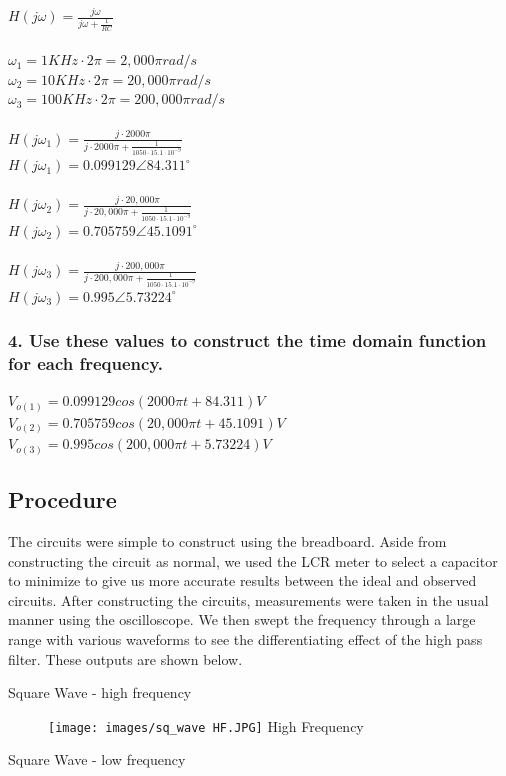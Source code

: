 \documentclass[11pt]{article}
\begin{document}
	$H(j\omega)=\frac{j\omega}{j\omega+\frac{1}{RC}}$\\\\
	$\omega_{1}=1KHz\cdot 2\pi=2,000\pi rad/s$\\
	$\omega_{2}=10KHz\cdot 2\pi=20,000\pi rad/s$\\
	$\omega_{3}=100KHz\cdot 2\pi=200,000\pi rad/s$\\\\
	$H(j\omega_{1})=\frac{j\cdot 2000\pi}{j\cdot 2000\pi+\frac{1}{1050\cdot 15.1 \cdot 10^{-9}}}$\\
	$H(j\omega_{1})=0.099129 \angle84.311^{\circ} $\\\\
	$H(j\omega_{2})=\frac{j\cdot 20,000\pi}{j\cdot 20,000\pi+\frac{1}{1050\cdot 15.1 \cdot 10^{-9}}}$\\
	$H(j\omega_{2})=0.705759 \angle45.1091^{\circ} $\\\\	
	$H(j\omega_{3})=\frac{j\cdot 200,000\pi}{j\cdot 200,000\pi+\frac{1}{1050\cdot 15.1 \cdot 10^{-9}}}$\\
	$H(j\omega_{3})=0.995 \angle5.73224^{\circ} $
	
	\subsubsection*{4. Use these values to construct the time domain function for each frequency.}
	
	$V_{o(1)}=0.099129cos(2000\pi t+84.311)V$\\
	$V_{o(2)}=0.705759cos(20,000\pi t+45.1091)V$\\
	$V_{o(3)}=0.995cos(200,000\pi t+5.73224)V$\\
	\subsection*{Procedure}
	The circuits were simple to construct using the breadboard. Aside from constructing the circuit as normal, we used the LCR meter to select a capacitor to minimize to give us more accurate results between the ideal and observed circuits. After constructing the circuits, measurements were taken in the usual manner using the oscilloscope. We then swept the frequency through a large range with various waveforms to see the differentiating effect of the high pass filter. These outputs are shown below.
	
	
	Square Wave - high frequency
	\begin{figure}[H]
		\centering
		\texttt{[image: images/sq\_wave HF.JPG]}
		High Frequency
	\end{figure}
	Square Wave - low frequency
	
\end{document}
